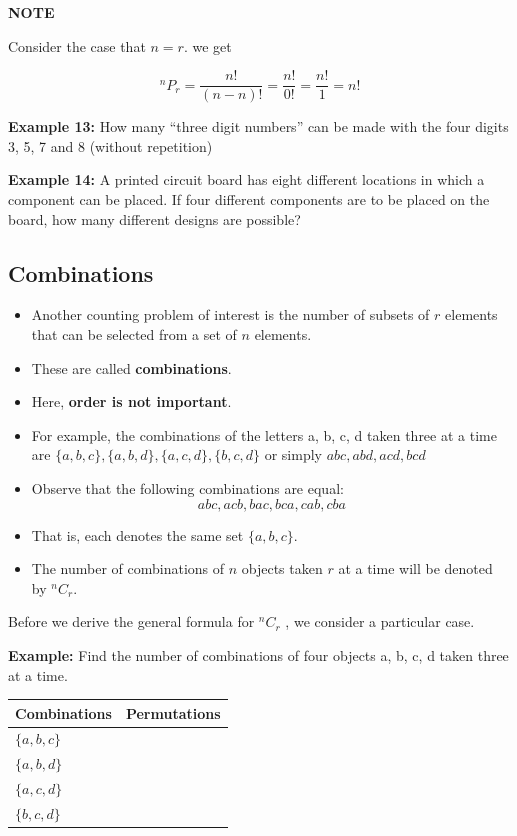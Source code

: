 \documentclass[]{book}
\begin{document}
\textbf{NOTE}

Consider the case that \(n = r\). we get

\[^nP_r=\frac{n!}{(n-n)!} = \frac{n!}{0!} = \frac{n!}{1}=n!\]

\textbf{Example 13:} How many ``three digit numbers'' can be made with the four digits 3, 5, 7 and 8 (without repetition)

\textbf{Example 14:} A printed circuit board has eight different locations in which a component can be placed. If four different components are to be placed on the board, how many different designs are possible?

\hypertarget{combinations}{%
\subsection{Combinations}\label{combinations}}

\begin{itemize}
\item
  Another counting problem of interest is the number of subsets of \(r\) elements that can be selected from a set of \(n\) elements.
\item
  These are called \textbf{combinations}.
\item
  Here, \textbf{order is not important}.
\item
  For example, the combinations of the letters a, b, c, d taken three at a time are \(\{a,b,c\}, \{a,b,d\}, \{a,c,d\}, \{b,c,d\}\) or simply \(abc, abd, acd, bcd\)
\item
  Observe that the following combinations are equal:
  \[abc, acb, bac, bca, cab, cba\]
\item
  That is, each denotes the same set \(\{a, b, c\}\).
\item
  The number of combinations of \(n\) objects taken \(r\) at a time will be denoted by \(^nC_r\).
\end{itemize}

Before we derive the general formula for \(^nC_r\) , we consider a particular case.

\textbf{Example:} Find the number of combinations of four objects a, b, c, d taken three at a time.

\begin{longtable}[]{@{}ll@{}}
\toprule
Combinations & Permutations\tabularnewline
\midrule
\endhead
\(\{a,b,c\}\) &\tabularnewline
\(\{a,b,d\}\) &\tabularnewline
\(\{a,c,d\}\) &\tabularnewline
\(\{b,c,d\}\) &\tabularnewline
\bottomrule
\end{longtable}
\end{document}
